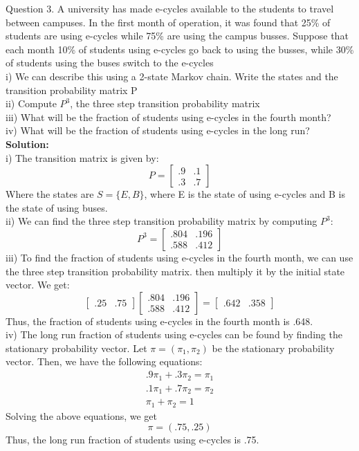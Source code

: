 \documentclass[answers,12pt,addpoints]{exam}
\begin{document}
\begin{questions}
\question Question 3.
A university has made e-cycles available to the students to travel between campuses. In the first
month of operation, it was found that 25\% of students are using e-cycles while 75\% are using the
campus busses. Suppose that each month 10\% of students using e-cycles go back to using the
busses, while 30\% of students using the buses switch to the e-cycles\\
i) We can describe this using a 2-state Markov chain. Write the states and the transition
probability matrix P\\
ii) Compute $P^3$, the three step transition probability matrix\\
iii) What will be the fraction of students using e-cycles in the fourth month? \\
iv) What will be the fraction of students using e-cycles in the long run? \\
\textbf{Solution:}\\
i) The transition matrix is given by:
$$P = \begin{bmatrix}
    .9 & .1\\
    .3 & .7
\end{bmatrix}$$
Where the states are $S = \{E, B\}$, where E is the state of using e-cycles and B is the state of using buses.\\
ii) We can find the three step transition probability matrix by computing $P^3$:
$$P^3 = \begin{bmatrix}
    .804 & .196\\
    .588 & .412
\end{bmatrix}$$
iii) To find the fraction of students using e-cycles in the fourth month, we can use the three step transition probability matrix. then multiply it by the initial state vector. We get:
$$\begin{bmatrix}
    .25 & .75
\end{bmatrix}\begin{bmatrix}
    .804 & .196\\
    .588 & .412
\end{bmatrix} = \begin{bmatrix}
    .642 & .358
\end{bmatrix}$$
Thus, the fraction of students using e-cycles in the fourth month is .648.\\
iv) The long run fraction of students using e-cycles can be found by finding the stationary probability vector. Let $\pi = (\pi_1, \pi_2)$ be the stationary probability vector. Then, we have the following equations:
\begin{align*}
    .9\pi_1 + .3\pi_2 = \pi_1\\
    .1\pi_1 + .7\pi_2 = \pi_2\\
    \pi_1 + \pi_2 = 1
\end{align*}
Solving the above equations, we get
$$\pi = (.75, .25)$$
Thus, the long run fraction of students using e-cycles is .75.


\end{questions}
\end{document}
